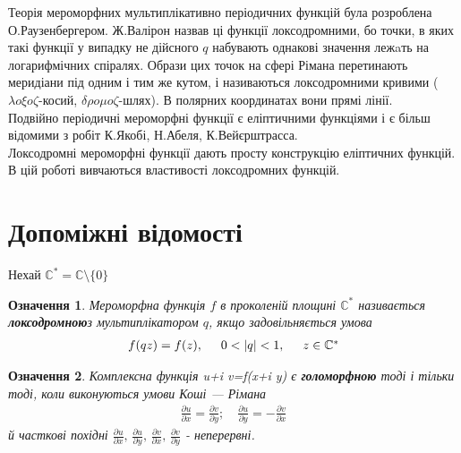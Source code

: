 \documentclass[12pt,a4paper]{article}
\begin{document}
Теорія мероморфних мультиплікативно періодичних функцій була розроблена О.Раузенбергером. Ж.Валірон назвав ці функції локсодромними, бо точки, в яких такі функції у випадку не дійсного $q$ набувають однакові значення лежaть на логарифмічних спіралях. Образи цих точок на сфері Рімана перетинають меридіани під одним і тим же кутом, і називаються локсодромними кривими ($\lambda o \xi o\zeta$-косий, $\delta \rho o \mu o\zeta$-шлях). В полярних координатах вони прямі лінії.\\
Подвійно періодичні мероморфні функції є еліптичними функціями і є більш відомими з робіт К.Якобі, Н.Абеля, К.Вейєрштрасса.\\
Локсодромні мероморфні функції дають просту конструкцію еліптичних функцій.\\
В цій роботі вивчаються властивості локсодромних функцій.
\vspace{1,5cm}


\clearpage
\section{Допоміжні відомості}
Нехай $\mathbb{C}^{*}=\mathbb{C}\setminus\lbrace 0 \rbrace$\label{Cstar}
\newtheorem{ozn}{Означення}
\begin{ozn}
 Мероморфна функція $f$ в проколеній площині $\mathbb{C}^{*}$ називається \textbf{локсодромною}\label{loxodrFun} з мультиплікатором $q$, якщо задовільняється умова 
\begin{equation}\label{eq0}
\begin{array}{l}
f(qz)=f(z),\hspace{0,5cm} 0<\vert q \vert<1,\hspace{0,5cm} z\in \mathbb{C}^{*}
\end{array}
\end{equation}
\end{ozn}
\vspace{1,5cm}

\begin{ozn}
 Комплексна функція u+i v=f(x+i y) є \textbf{голоморфною} \label{holomFun}тоді і тільки тоді, коли виконуються умови Коші — Рімана \label{KoshiRimana}
\[\begin{array}{l}
    \frac{\partial u}{\partial x}=\frac{\partial v}{\partial y};\quad \frac{\partial u}{\partial y}=-\frac{\partial v}{\partial x}
\end{array}\]
й часткові похідні 
$\frac{\partial u}{\partial x},\,\frac{\partial u}{\partial y},\,\frac{\partial v}{\partial x},\,\frac{\partial v}{\partial y}$ - неперервні.
\end{ozn}
\vspace{1,5cm}
\end{document}
